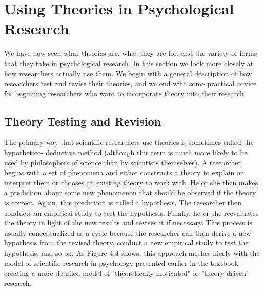 \newpage
\section{Using Theories in Psychological Research}


We have now seen what theories are, what they are for, and the variety of forms that they take in psychological research. In this section we look more closely at how researchers actually use them. We begin with a general description of how researchers test and revise their theories, and we end with some practical advice for beginning researchers who want to incorporate theory into their research.

\subsection{Theory Testing and Revision}

The primary way that scientific researchers use theories is sometimes called the hypothetico- deductive method (although this term is much more likely to be used by philosophers of science than by scientists themselves). A researcher begins with a set of phenomena and either constructs a theory to explain or interpret them or chooses an existing theory to work with. He or she then makes a prediction about some new phenomenon that should be observed if the theory is correct. Again, this prediction is called a hypothesis. The researcher then conducts an empirical study to test the hypothesis. Finally, he or she reevaluates the theory in light of the new results and revises it if necessary. This process is usually conceptualized as a cycle because the researcher can then derive a new hypothesis from the revised theory, conduct a new empirical study to test the hypothesis, and so on. As Figure 4.4 shows, this approach meshes nicely with the model of scientific research in psychology presented earlier in the textbook---creating a more detailed model of "theoretically motivated" or "theory-driven" research.

